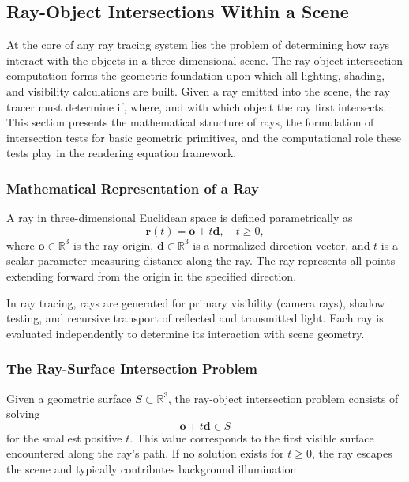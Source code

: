 \documentclass[11pt]{article}
\begin{document}
\subsection{Ray-Object Intersections Within a Scene}

At the core of any ray tracing system lies the problem of determining how rays interact with the objects in a three-dimensional scene. The ray-object intersection computation forms the geometric foundation upon which all lighting, shading, and visibility calculations are built. Given a ray emitted into the scene, the ray tracer must determine if, where, and with which object the ray first intersects. This section presents the mathematical structure of rays, the formulation of intersection tests for basic geometric primitives, and the computational role these tests play in the rendering equation framework.

\subsubsection{Mathematical Representation of a Ray}

A ray in three-dimensional Euclidean space is defined parametrically as
\begin{equation}
\mathbf{r}(t) = \mathbf{o} + t\mathbf{d}, \quad t \geq 0,
\end{equation}
where $\mathbf{o} \in \mathbb{R}^3$ is the ray origin, $\mathbf{d} \in \mathbb{R}^3$ is a normalized direction vector, and $t$ is a scalar parameter measuring distance along the ray. The ray represents all points extending forward from the origin in the specified direction.

In ray tracing, rays are generated for primary visibility (camera rays), shadow testing, and recursive transport of reflected and transmitted light. Each ray is evaluated independently to determine its interaction with scene geometry.

\subsubsection{The Ray-Surface Intersection Problem}

Given a geometric surface $S \subset \mathbb{R}^3$, the ray-object intersection problem consists of solving
\begin{equation}
\mathbf{o} + t\mathbf{d} \in S
\end{equation}
for the smallest positive $t$. This value corresponds to the first visible surface encountered along the ray's path. If no solution exists for $t \geq 0$, the ray escapes the scene and typically contributes background illumination.
\end{document}
